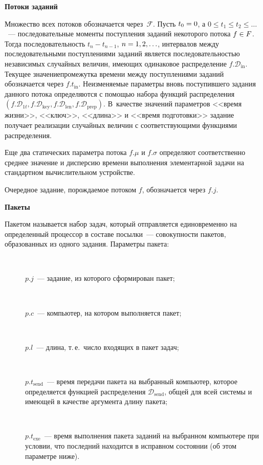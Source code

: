 \begin{multicols}{2}
\smallskip
\textbf{Потоки заданий}
\smallskip

    Множество всех потоков обозначается через~$\mathcal{F}$. Пусть $t_0\hm=0$, а 
$0\leq t_1\leq t_2\leq\ldots$~--- последовательные моменты поступления 
заданий некоторого потока $f\hm\in F$. Тогда последовательность $t_n-t_{n-
1}$, $n\hm=1, 2, \ldots$, интервалов между последовательными 
поступлениями заданий является по\-сле\-до\-ва\-тель\-ностью независимых 
случайных величин, имеющих одинаковое распределение 
$f.\mathcal{D}_{\mathrm{in}}$. Текущее значение\linebreak промежутка времени между 
поступлениями заданий обозначается через $f.t_{\mathrm{in}}$. 
Неизменяемые параметры вновь поступившего задания данного потока 
определяются с помощью набора функций распределе\-ния 
$(f.\mathcal{D}_{1t}, f.\mathcal{D}_{\mathrm{key}}, f.\mathcal{D}_{\mathrm{len}}, 
f.\mathcal{D}_{\mathrm{prep}})$. В~качестве 
значений параметров <<время жизни>>, <<ключ>>, <<длина>> и <<время 
подготовки>> задание получает реализации случайных величин с 
соответствующими функциями распределения.
    
    Еще два статических параметра потока $f.\mu$ и $f.\sigma$ определяют 
соответственно среднее значение и дисперсию времени выполнения 
элементарной задачи на стандартном вычислительном устройстве.
    
    Очередное задание, порождаемое потоком $f$, обозначается через $f.j$.

\medskip
\textbf{Пакеты}
\smallskip

    Пакетом называется набор задач, который отправляется единовременно 
на определенный процессор в составе посылки~--- совокупности пакетов,\linebreak 
образованных из одного задания. Параметры па\-кета:
    \begin{description}
      \item[\,] $p.j$~--- задание, из которого сформирован пакет;
      \item[\,] $p.c$~--- компьютер, на котором выполняется пакет;
      \item[\,] $p.l$~--- длина, т.\,е.\ чис\-ло входящих в пакет задач;
      \item[\,]  $p.t_{\mathrm{send}}$~--- время передачи пакета на выбранный 
компьютер, которое определяется функцией распределения 
$\mathcal{D}_{\mathrm{send}}$, общей для всей сис\-те\-мы и имеющей в качестве 
аргумента длину пакета;
      \item[\,] $p.t_{\mathrm{exe}}$~--- время выполнения пакета заданий 
на выбранном компьютере при условии, что последний находится в 
исправном состоянии (об этом параметре ниже).
      \end{description}
      

\end{multicols}

